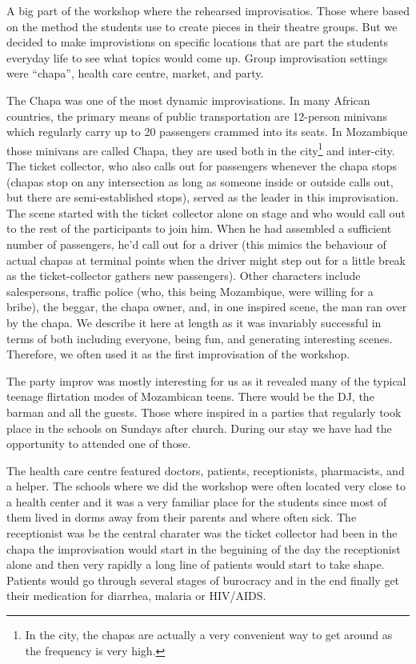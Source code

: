 \documentclass[article,twocolumn,twoside]{memoir}
\begin{document}
A big part of the workshop where the rehearsed improvisatios. Those where based
on the method the students use to create pieces in their theatre groups. But we
decided to make improvistions on specific locations that are part the students
everyday life to see what topics would come up. Group improvisation settings
were ``chapa'', health care centre, market, and party.

The Chapa was one of the most dynamic improvisations. In many African
countries, the primary means of public transportation are 12-person minivans
which regularly carry up to 20 passengers crammed into its seats. In
Mozambique those minivans are called Chapa, they are used both in the
city\footnote{In the city, the chapas are actually a very convenient way to get
around as the frequency is very high.} and inter-city. The ticket collector,
who also calls out for passengers whenever the chapa stops (chapas stop on any
intersection as long as someone inside or outside calls out, but there are
semi-established stops), served as the leader in this improvisation. The
scene started with the ticket collector alone on stage and who would call out
to the rest of the participants to join him. When he had assembled a sufficient
number of passengers, he'd call out for a driver (this mimics the behaviour of
actual chapas at terminal points when the driver might step out for a little
break as the ticket-collector gathers new passengers). Other characters include
salespersons, traffic police (who, this being Mozambique, were willing for a
bribe), the beggar, the chapa owner, and, in one inspired scene, the man ran over
by the chapa. We describe it here at length as it was invariably successful in
terms of both including everyone, being fun, and generating interesting scenes.
Therefore, we often used it as the first improvisation of the workshop.

The party improv was mostly interesting for us as it revealed many of the
typical teenage flirtation modes of Mozambican teens. There would be the DJ,
the barman and all the guests. Those where inspired in a parties that regularly
took place in the schools on Sundays after church. During our stay we have had
the opportunity to attended one of those.

The health care centre featured doctors, patients, receptionists, pharmacists,
and a helper. The schools where we did the workshop were often located very
close to a health center and it was a very familiar place for the students
since most of them lived in dorms away from their parents and where often sick.
The receptionist was be the central charater was the ticket collector had been
in the chapa the improvisation would start in the beguining of the day the
receptionist alone and then very rapidly a long line of patients would start to
take shape. Patients would go through several stages of burocracy and in the
end finally get their medication for diarrhea, malaria or HIV/AIDS.
\end{document}
